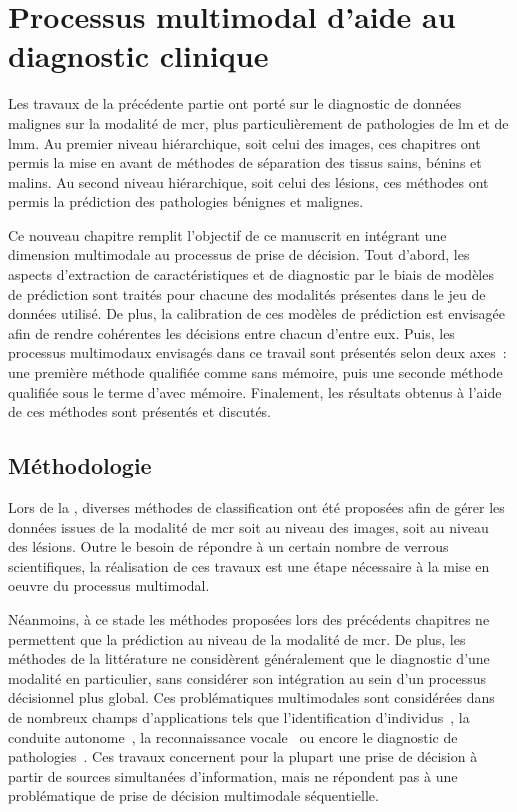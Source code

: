 \renewcommand{\thechapter}{\arabic{chapter}}
\setcounter{chapter}{7}

\chapter{Processus multimodal d'aide au diagnostic clinique}
\label{chap:chapter_8}
\chapterintro
Les travaux de la précédente partie ont porté sur le diagnostic de données malignes sur la modalité de \acrlong{mcr}, plus particulièrement de pathologies de \acrlong{lm} et de \acrlong{lmm}. Au premier niveau hiérarchique, soit celui des images, ces chapitres ont permis la mise en avant de méthodes de séparation des tissus sains, bénins et malins. Au second niveau hiérarchique, soit celui des lésions, ces méthodes ont permis la prédiction des pathologies bénignes et malignes.\par

Ce nouveau chapitre remplit l'objectif de ce manuscrit en intégrant une dimension multimodale au processus de prise de décision. Tout d'abord, les aspects d'extraction de caractéristiques et de diagnostic par le biais de modèles de prédiction sont traités pour chacune des modalités présentes dans le jeu de données utilisé. De plus, la calibration de ces modèles de prédiction est envisagée afin de rendre cohérentes les décisions entre chacun d’entre eux. Puis, les processus multimodaux envisagés dans ce travail sont présentés selon deux axes~: une première méthode qualifiée comme sans mémoire, puis une seconde méthode qualifiée sous le terme d’avec mémoire. Finalement, les résultats obtenus à l'aide de ces méthodes sont présentés et discutés.\par
\newpage

\section{Méthodologie}
Lors de la , diverses méthodes de classification ont été proposées afin de gérer les données issues de la modalité de \gls{mcr} soit au niveau des images, soit au niveau des lésions. Outre le besoin de répondre à un certain nombre de verrous scientifiques, la réalisation de ces travaux est une étape nécessaire à la mise en oeuvre du processus multimodal.\par

Néanmoins, à ce stade les méthodes proposées lors des précédents chapitres ne permettent que la prédiction au niveau de la modalité de \gls{mcr}. De plus, les méthodes de la littérature ne considèrent généralement que le diagnostic d'une modalité en particulier, sans considérer son intégration au sein d'un processus décisionnel plus global. Ces problématiques multimodales sont considérées dans de nombreux champs d'applications tels que l'identification d'individus~\cite{Lupu2008}, la conduite autonome~\cite{Xiao2019}, la reconnaissance vocale~\cite{Ngiam2011} ou encore le diagnostic de pathologies~\cite{Lim2014, Liu2015a}. Ces travaux concernent pour la plupart une prise de décision à partir de sources simultanées d'information, mais ne répondent pas à une problématique de prise de décision multimodale séquentielle.\par

